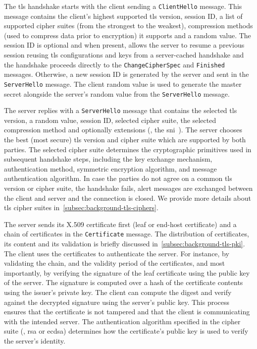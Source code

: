 The \gls{tls} handshake starts with the client sending a \texttt{ClientHello} message.
This message contains the client's highest supported \gls{tls} version, session ID, a list of supported cipher suites (from the strongest to the weakest), compression methods (used to compress data prior to encryption) it supports and a random value.
The session ID is optional and when present, allows the server to resume a previous session reusing \gls{tls} configurations and keys from a server-cached handshake and the handshake proceeds directly to the \texttt{ChangeCipherSpec} and \texttt{Finished} messages.
Otherwise, a new session ID is generated by the server and sent in the \texttt{ServerHello} message.
The client random value is used to generate the master secret alongside the server's random value from the \texttt{ServerHello} message.

The server replies with a \texttt{ServerHello} message that contains the selected \gls{tls} version, a random value, session ID, selected cipher suite, the selected compression method and optionally extensions (\eg, the \gls{sni}~\cite{rfc6066}).
The server chooses the best (most secure) \gls{tls} version and cipher suite which are supported by both parties.
The selected cipher suite determines the cryptographic primitives used in subsequent handshake steps, including the key exchange mechanism, authentication method, symmetric encryption algorithm, and message authentication algorithm.
In case the parties do not agree on a common \gls{tls} version or cipher suite, the handshake fails, alert messages are exchanged between the client and server and the connection is closed.
We provide more details about \gls{tls} cipher suites in~\cref{subsec:background-tls-ciphers}.

The server sends its X.509 certificate first (leaf or end-host certificate) and a chain of certificates in the \texttt{Certificate} message.
The distribution of certificates, its content and its validation is briefly discussed in~\cref{subsec:background-tls-pki}.
The client uses the certificates to authenticate the server.
For instance, by validating the chain, and the validity period of the certificates, and most importantly, by verifying the signature of the leaf certificate using the public key of the server.
The signature is computed over a hash of the certificate contents using the issuer's private key.
The client can compute the digest and verify against the decrypted signature using the server's public key.
This process ensures that the certificate is not tampered and that the client is communicating with the intended server.
The authentication algorithm specified in the cipher suite (\eg, \gls{rsa} or \gls{ecdsa}) determines how the certificate's public key is used to verify the server's identity.


